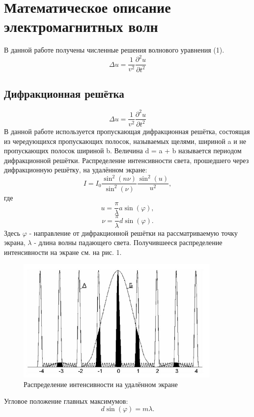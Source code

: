 \documentclass[
11pt,%
tightenlines,%
twoside,%
onecolumn,%
nofloats,%
nobibnotes,%
nofootinbib,%
superscriptaddress,%
noshowpacs,%
centertags]%
{revtex4}
\begin{document}
\section{Математическое описание электромагнитных волн}
В данной работе получены численные решения волнового уравнения (1).
\begin{equation}
    \Delta u = \frac{1}{v^2}\frac{\partial^2u}{\partial t^2}
\end{equation}

\subsection{Дифракционная решётка}
\begin{equation}
    \Delta u = \frac{1}{v^2}\frac{\partial^2u}{\partial t^2}
\end{equation}
В данной работе используется пропускающая дифракционная решётка, состоящая из чередующихся пропускающих
полосок, называемых щелями, шириной a и не пропускающих полосок шириной b. Величина d = a + b называется
периодом дифракционной решётки. Распределение интенсивности света, прошедшего через дифракционную
решётку, на удалённом экране:
\begin{equation}
    I = I_0 \frac{\sin^2(n\nu)}{\sin^2(\nu)}\frac{\sin^2(u)}{u^2},
\end{equation}  
где 
\begin{equation}
    u = \frac{\pi}{\lambda} a \sin(\varphi),
\end{equation}
\begin{equation}
    \nu = \frac{\pi}{\lambda} d \sin(\varphi).
\end{equation}
Здесь $\varphi$ - направление  от дифракционной решётки на рассматриваемую точку экрана, $\lambda$ - 
длина волны падающего света. 
Получившееся распределение интенсивности на экране см. на рис. 1.
\begin{figure}[h]
    \centering
    \includegraphics[width=10cm]{intensity.jpg}
    \caption{Распределение интенсивности на удалённом экране}
    \label{fig:1}
\end{figure}
\newline
Угловое положение главных максимумов:
\begin{equation}
    d\sin(\varphi) = m\lambda.
\end{equation}
\end{document}
